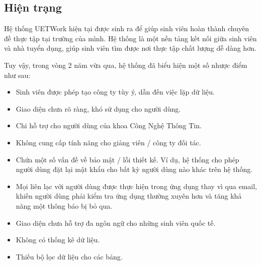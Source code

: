 \documentclass[./../main.tex]{subfiles}
\begin{document}
\subsection{Hiện trạng}

Hệ thống UETWork hiện tại được sinh ra để giúp sinh viên hoàn thành
chuyên đề thực tập tại trường của mình. Hệ thống là một nền tảng kết nối
giữa sinh viên và nhà tuyển dụng, giúp sinh viên tìm được nơi thực tập
chất lượng dễ dàng hơn.

Tuy vậy, trong vòng 2 năm vừa qua, hệ thống đã biểu hiện một số nhược
điểm như sau:

\begin{itemize}
\item
  
  Sinh viên được phép tạo công ty tùy ý, dẫn đến việc lặp dữ liệu.
  
\item
  
  Giao diện chưa rõ ràng, khó sử dụng cho người dùng.
  
\item
  
  Chi hỗ trợ cho người dùng của khoa Công Nghệ Thông Tin.
  
\item
  
  Không cung cấp tính năng cho giảng viên / công ty đối tác.
  
\item
  
  Chứa một số vấn đề về bảo mật / lỗi thiết kế. Ví dụ, hệ thống cho phép
  người dùng đặt lại mật khẩu cho bất kỳ người dùng nào khác trên hệ
  thống.
  
\item
  
  Mọi liên lạc với người dùng được thực hiện trong ứng dụng thay vì qua
  email, khiến người dùng phải kiểm tra ứng dụng thường xuyên hơn và
  tăng khả năng một thông báo bị bỏ qua.
  
\item
  
  Giao diện chưa hỗ trợ đa ngôn ngữ cho những sinh viên quốc tế.
  
\item
  
  Không có thống kê dữ liệu.
  
\item
  
  Thiếu bộ lọc dữ liệu cho các bảng.
  
\end{itemize}
\end{document}

